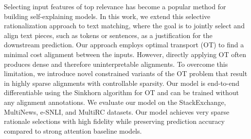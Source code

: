 Selecting input features of top relevance has become a popular method for building self-explaining models. In this work, we extend this selective rationalization approach to text matching, where the goal is to jointly select and align text pieces, such as tokens or sentences, as a justification for the downstream prediction. Our approach employs optimal transport (OT) to find a minimal cost alignment between the inputs. However, directly applying OT often produces dense and therefore uninterpretable alignments. To overcome this limitation, we introduce novel constrained variants of the OT problem that result in highly sparse alignments with controllable sparsity. Our model is end-to-end differentiable using the Sinkhorn algorithm for OT and can be trained without any alignment annotations. We evaluate our model on the StackExchange, MultiNews, e-SNLI, and MultiRC datasets. Our model achieves very sparse rationale selections with high fidelity while preserving prediction accuracy compared to strong attention baseline models.
